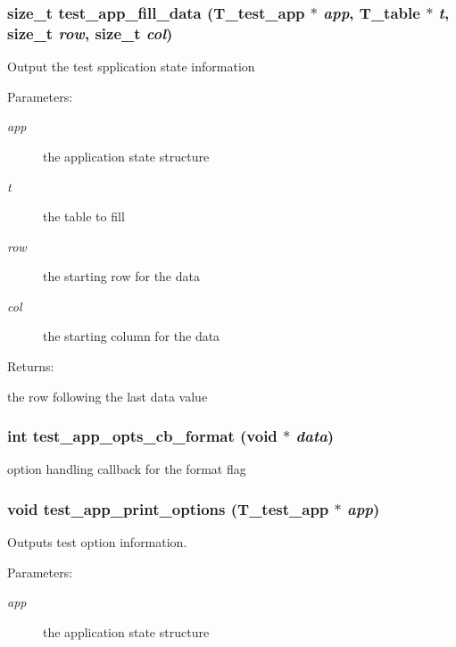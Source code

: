 \subsubsection{\setlength{\rightskip}{0pt plus 5cm}size\_\-t test\_\-app\_\-fill\_\-data ({\bf T\_\-test\_\-app} $\ast$ {\em app}, {\bf T\_\-table} $\ast$ {\em t}, size\_\-t {\em row}, size\_\-t {\em col})}\label{group__test__app_a4}


Output the test spplication state information \begin{Desc}
\item[Parameters: ]\par
\begin{description}
\item[{\em 
app}]the application state structure \item[{\em 
t}]the table to fill \item[{\em 
row}]the starting row for the data  \item[{\em 
col}]the starting column for the data \end{description}
\end{Desc}
\begin{Desc}
\item[Returns: ]\par
the row following the last data value \end{Desc}
\subsubsection{\setlength{\rightskip}{0pt plus 5cm}int test\_\-app\_\-opts\_\-cb\_\-format (void $\ast$ {\em data})}\label{group__test__app_a1}


option handling callback for the format flag 
\subsubsection{\setlength{\rightskip}{0pt plus 5cm}void test\_\-app\_\-print\_\-options ({\bf T\_\-test\_\-app} $\ast$ {\em app})}\label{group__test__app_a3}


Outputs test option information.

\begin{Desc}
\item[Parameters: ]\par
\begin{description}
\item[{\em 
app}]the application state structure \end{description}
\end{Desc}
